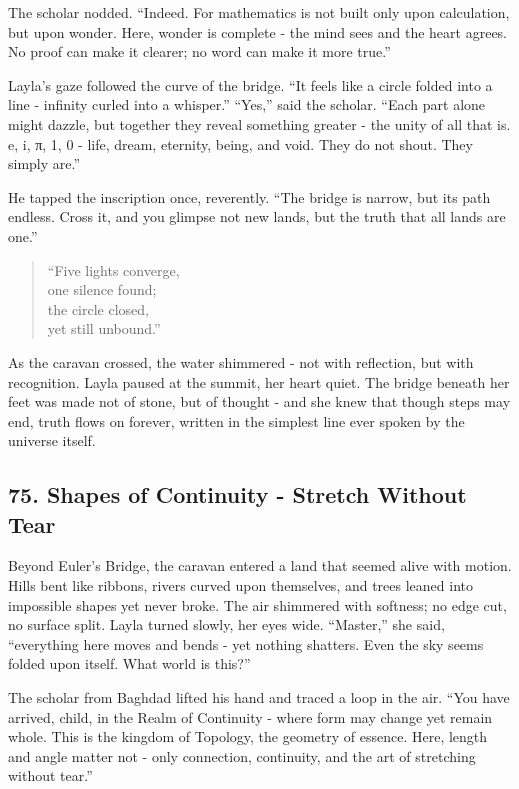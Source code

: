 \documentclass[
  letterpaper,
  DIV=11,
  numbers=noendperiod]{scrreprt}
\begin{document}
The scholar nodded. ``Indeed. For mathematics is not built only upon
calculation, but upon wonder. Here, wonder is complete - the mind sees
and the heart agrees. No proof can make it clearer; no word can make it
more true.''

Layla's gaze followed the curve of the bridge. ``It feels like a circle
folded into a line - infinity curled into a whisper.'' ``Yes,'' said the
scholar. ``Each part alone might dazzle, but together they reveal
something greater - the unity of all that is. e, i, π, 1, 0 - life,
dream, eternity, being, and void. They do not shout. They simply are.''

He tapped the inscription once, reverently. ``The bridge is narrow, but
its path endless. Cross it, and you glimpse not new lands, but the truth
that all lands are one.''

\begin{quote}
``Five lights converge,\\
one silence found;\\
the circle closed,\\
yet still unbound.''
\end{quote}

As the caravan crossed, the water shimmered - not with reflection, but
with recognition. Layla paused at the summit, her heart quiet. The
bridge beneath her feet was made not of stone, but of thought - and she
knew that though steps may end, truth flows on forever, written in the
simplest line ever spoken by the universe itself.

\subsection{75. Shapes of Continuity - Stretch Without
Tear}\label{shapes-of-continuity---stretch-without-tear}

Beyond Euler's Bridge, the caravan entered a land that seemed alive with
motion. Hills bent like ribbons, rivers curved upon themselves, and
trees leaned into impossible shapes yet never broke. The air shimmered
with softness; no edge cut, no surface split. Layla turned slowly, her
eyes wide. ``Master,'' she said, ``everything here moves and bends - yet
nothing shatters. Even the sky seems folded upon itself. What world is
this?''

The scholar from Baghdad lifted his hand and traced a loop in the air.
``You have arrived, child, in the Realm of Continuity - where form may
change yet remain whole. This is the kingdom of Topology, the geometry
of essence. Here, length and angle matter not - only connection,
continuity, and the art of stretching without tear.''
\end{document}
